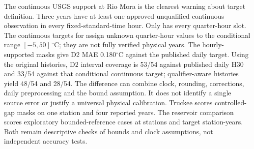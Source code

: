 The continuous USGS support at Rio Mora is the clearest warning about target definition. Three years have at least one approved unqualified continuous observation in every fixed-standard-time hour. Only \RioCompleteQuarterYear{} has every quarter-hour slot. The continuous targets for \RioBoundedYears{} assign unknown quarter-hour values to the conditional range $[-5,50]\,^{\circ}$C; they are not fully verified physical years. The \RioHourlyMasks{} hourly-supported masks give D2 MAE 0.180$^{\circ}$C against the published daily target. Using the original histories, D2 interval coverage is 53/54 against published daily H30 and 33/54 against that conditional continuous target; qualifier-aware histories yield 48/54 and 28/54. The difference can combine clock, rounding, corrections, daily preprocessing and the bound assumption. It does not identify a single source error or justify a universal physical calibration. Truckee scores \TruckeeCases{} controlled-gap masks on one station and four reported years. The reservoir comparison scores \ResScoreCases{} exploratory bounded-reference cases at \ResScoreStations{} stations and \ResScoreYears{} target station-years. Both remain descriptive checks of bounds and clock assumptions, not independent accuracy tests.

